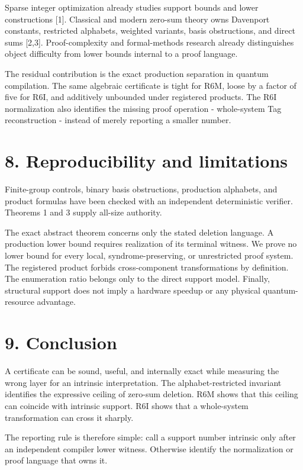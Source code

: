 \documentclass[
  11pt,
]{article}
\begin{document}
Sparse integer optimization already studies support bounds and lower
constructions {[}1{]}. Classical and modern zero-sum theory owns
Davenport constants, restricted alphabets, weighted variants, basis
obstructions, and direct sums {[}2,3{]}. Proof-complexity and
formal-methods research already distinguishes object difficulty from
lower bounds internal to a proof language.

The residual contribution is the exact production separation in quantum
compilation. The same algebraic certificate is tight for R6M, loose by a
factor of five for R6I, and additively unbounded under registered
products. The R6I normalization also identifies the missing proof
operation - whole-system Tag reconstruction - instead of merely
reporting a smaller number.

\hypertarget{reproducibility-and-limitations}{%
\section{8. Reproducibility and
limitations}\label{reproducibility-and-limitations}}

Finite-group controls, binary basis obstructions, production alphabets,
and product formulas have been checked with an independent deterministic
verifier. Theorems 1 and 3 supply all-size authority.

The exact abstract theorem concerns only the stated deletion language. A
production lower bound requires realization of its terminal witness. We
prove no lower bound for every local, syndrome-preserving, or
unrestricted proof system. The registered product forbids
cross-component transformations by definition. The enumeration ratio
belongs only to the direct support model. Finally, structural support
does not imply a hardware speedup or any physical quantum-resource
advantage.

\hypertarget{conclusion}{%
\section{9. Conclusion}\label{conclusion}}

A certificate can be sound, useful, and internally exact while measuring
the wrong layer for an intrinsic interpretation. The alphabet-restricted
invariant identifies the expressive ceiling of zero-sum deletion. R6M
shows that this ceiling can coincide with intrinsic support. R6I shows
that a whole-system transformation can cross it sharply.

The reporting rule is therefore simple: call a support number intrinsic
only after an independent compiler lower witness. Otherwise identify the
normalization or proof language that owns it.
\end{document}
